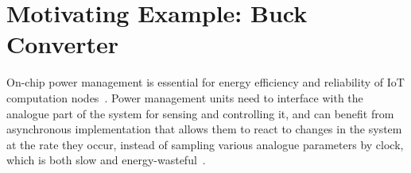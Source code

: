\documentclass[british,compsoc]{IEEEtran}
\newcommand{\noun}[1]{\textsc{#1}}
\begin{document}




\section{Motivating Example: Buck Converter\label{sec:Motivating Example}}

On-chip power management is essential for energy efficiency and reliability of
IoT computation nodes~\cite{7287733}. Power management units need to interface
with the analogue part of the system for sensing and controlling it, and can
benefit from asynchronous implementation that allows them to react to changes
in the system at the rate they occur, instead of sampling various analogue
parameters by clock, which is both slow and energy-wasteful~\cite{2014_sokolov_ftfc}.
\end{document}
